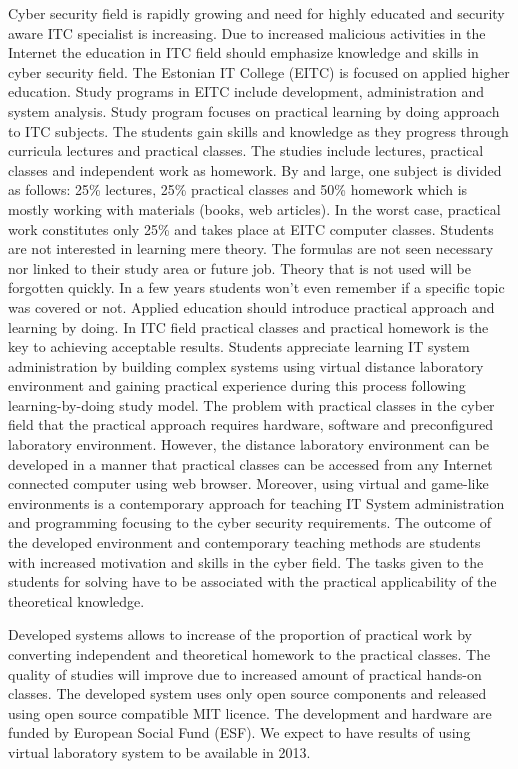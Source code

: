 
Cyber security field is rapidly growing and need for highly educated and security aware ITC specialist is increasing. Due to increased malicious activities in the Internet the education in ITC field should emphasize knowledge and skills in cyber security field.
The Estonian IT College (EITC) is focused on applied higher education. Study programs in EITC include development, administration and system analysis. Study program focuses on practical learning by doing approach to ITC subjects. The students gain skills and knowledge as they progress through curricula lectures and practical classes. The studies include lectures, practical classes and independent work as homework. By and large, one subject is divided as follows: 25\% lectures, 25\% practical classes and 50\% homework which is mostly working with materials (books, web articles). In the worst case, practical work constitutes only 25\% and takes place at EITC computer classes. Students are not interested in learning mere theory. The formulas are not seen necessary nor linked to their study area or future job. Theory that is not used will be forgotten quickly. In a few years students won't even remember if a specific topic was covered or not. Applied education should introduce practical approach and learning by doing. In ITC field practical classes and practical homework is the key to achieving acceptable results. Students appreciate learning IT system administration by building complex systems using virtual distance laboratory environment and gaining practical experience during this process following learning-by-doing study model.
The problem with practical classes in the cyber field that the practical approach requires hardware, software and preconfigured laboratory environment. However, the  distance laboratory environment can be developed in a manner  that practical classes can be accessed from any Internet connected computer using web browser. Moreover, using virtual and game-like environments is a contemporary approach for teaching IT System administration and programming focusing to the cyber security requirements. The outcome of the developed environment and contemporary teaching methods are students with increased motivation and skills in the cyber field. The tasks given to the students for solving have to be associated with the practical applicability of the theoretical knowledge.

Developed systems allows to  increase of the proportion of practical work by converting independent and theoretical homework to  the practical classes. The quality of studies will improve due to increased amount of practical hands-on classes. The developed system uses only open source components and released using open source compatible MIT licence. The development and hardware are funded by European Social Fund (ESF). We expect to have results of using virtual laboratory system to be available in 2013.



\cite{van1999cluster}
\cite{url:yoga}

